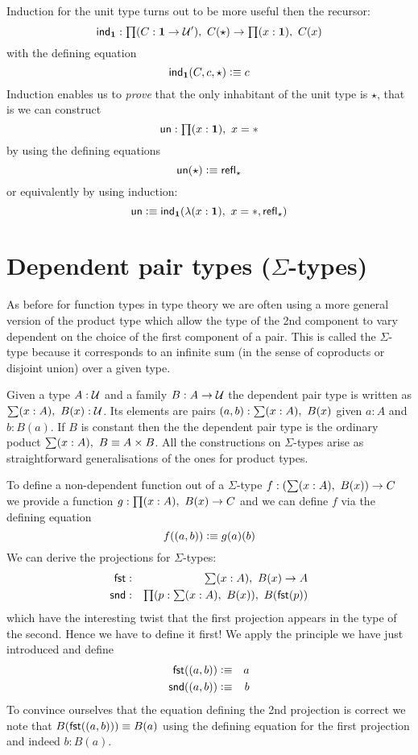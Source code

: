 Induction for the unit type turns out to be more useful then the
recursor: 
\[ \ind{\unit} : \prd{C:\unit \to \UU'} C(\star) \to \prd{x:\unit}C(x)\]
with the defining equation
\[ \mathsf{ind}_{\mathbf{1}}(C,c,\star) \vcentcolon\equiv c \]
Induction enables us to \emph{prove} that the only inhabitant of the
unit type is $\star$, that is we can construct
\[\un : \prd{x:\unit} x = * \]
by using the defining equations
\[\mathsf{un}(\star) \vcentcolon\equiv \mathsf{refl}_{\star} \]
or equivalently by using induction:
\[\un \defeq \ind{\unit}(\lam{x:\unit} x = *,\refl{\star}) \]

\section{Dependent pair types (\texorpdfstring{$\Sigma$}{Σ}-types)}
\label{sec:sigma-types}

As before for function types in type theory we are often using a
more general version of the product type which allow the type of
the 2nd component to vary dependent on the choice of the first
component of a pair. This is called the $\Sigma$-type because it
corresponds to an infinite sum (in the sense of coproducts or
disjoint union) over a given type.

Given a type $A:\mathcal{U}$ and a family $B : A \to \mathcal{U}$ the dependent
pair type is written as $\sm{x:A} B(x) : \UU$. Its elements are
pairs $\tup{a}{b} : \sm{x:A} B(x)$ given $a:A$ and $b:B(a)$.
If $B$ is constant then the the dependent pair type is the
ordinary poduct $\sm{x:A} B \jdeq A \times B$. All the
constructions on $\Sigma$-types arise as straightforward
generalisations of the ones for product types.

To define a non-dependent function out of a $\Sigma$-type
$f : (\sm{x:A} B(x)) \to C$ we provide a function 
$g : \prd{x:A} B(x) \to C$ and we can define $f$ via the defining
equation
\[ f(( a,b)) \vcentcolon\equiv g(a)(b) \]
We can derive the projections for $\Sigma$-types:
\begin{eqnarray*}
  \fst & : & \sm{x : A}B(x) \to A \\
  \snd & : & \prd{p:\sm{x : A}B(x)}B(\fst(p))
\end{eqnarray*}
which have the interesting twist that the first projection appears
in the type of the second. Hence we have to define it first!
We apply the principle we have just introduced and define
\begin{eqnarray*}
  \mathsf{fst}(( a,b)) & \vcentcolon\equiv & a \\
  \mathsf{snd}(( a,b)) & \vcentcolon\equiv & b
\end{eqnarray*}
To convince ourselves that the equation defining the 2nd
projection is correct we note that $B (\mathsf{fst}(( a,b))) \equiv
B(a)$ using the defining equation for the first projection and
indeed $b : B(a)$. 

